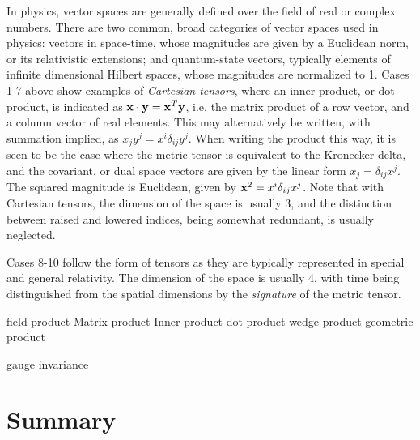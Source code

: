 \documentclass{llncs}
\begin{document}
In physics, vector spaces are generally defined over the field of real
or complex numbers.
There are two common, broad categories of vector spaces used in
physics: vectors in space-time, whose magnitudes are given by a
Euclidean norm, or its relativistic extensions;
and quantum-state vectors, typically elements of
infinite dimensional Hilbert spaces, whose magnitudes are normalized
to 1.
Cases 1-7 above show examples of {\em Cartesian tensors}, where an
inner product, or dot product, is indicated as
${\bf x} \cdot {\bf y} = {\bf x}^T{\bf y}$, i.e. the matrix product
of a row vector, and a column vector of real elements.
This may alternatively be written, with summation implied, as 
$x_j y^j = x^i{\delta}_{ij}y^j$.
When writing the product this way, it is seen to be the case where the
metric tensor is equivalent to the Kronecker delta, and the covariant,
or dual space vectors are given by the linear form $x_j =
\delta_{ij}x^j$.
The squared magnitude is Euclidean, given by
${\bf x}^2 = x^i \delta_{ij}x^j$.
Note that with Cartesian tensors, the dimension of the space is
usually 3, and the distinction between raised and
lowered indices, being somewhat redundant, is usually neglected.

Cases 8-10 follow the form of tensors as they are typically represented
in special and general relativity.
The dimension of the space is usually 4, with time being distinguished
from the spatial dimensions by the {\em signature} of the metric
tensor.







field product
Matrix product
Inner product
dot product
wedge product
geometric product

gauge invariance

\section{Summary}
\end{document}
